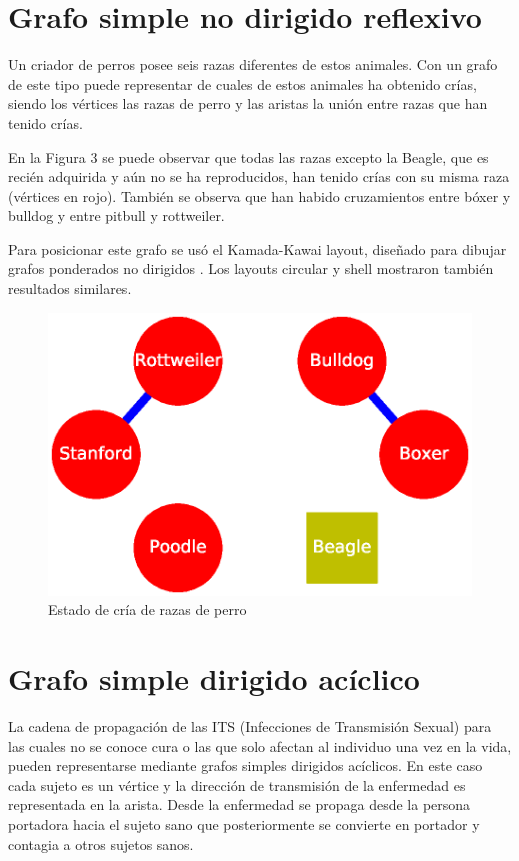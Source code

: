 \documentclass{article}
\begin{document}


\section{Grafo simple no dirigido reflexivo}

Un criador de perros posee seis razas diferentes de estos animales. Con un grafo de este tipo puede representar de cuales de estos animales ha obtenido crías, siendo los vértices las razas de perro y las aristas la unión entre razas que han tenido crías.

En la Figura 3 se puede observar que todas las razas excepto la Beagle, que es recién adquirida y aún no se ha reproducidos, han tenido crías con su misma raza (vértices en rojo). También se observa que han habido cruzamientos entre bóxer y bulldog y entre pitbull y rottweiler.

Para posicionar este grafo se usó el Kamada-Kawai layout, diseñado para dibujar grafos ponderados no dirigidos \cite{kamada1989algorithm}. Los layouts circular y shell mostraron también resultados similares.


\begin{figure}
  \includegraphics[width=.8\columnwidth]{fig3.eps}
  \caption{Estado de cría de razas de perro}
  \label{Figura 3}
\end{figure}



\section{Grafo simple dirigido acíclico}

La cadena de propagación de las ITS (Infecciones de Transmisión Sexual) para las cuales no se conoce cura o las que solo afectan al individuo una vez en la vida, pueden representarse mediante grafos simples dirigidos acíclicos. En este caso cada sujeto es un vértice y la dirección de transmisión de la enfermedad es representada en la arista. Desde la enfermedad se propaga desde la persona portadora hacia el sujeto sano que posteriormente se convierte en portador y contagia a otros sujetos sanos.
\end{document}
